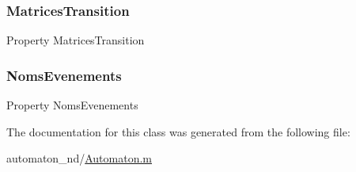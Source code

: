 \mbox{\label{class_automaton_ac685ee2b0b12e73b394a56bbd94b2d0c}} 
\subsubsection{\texorpdfstring{Matrices\+Transition}{MatricesTransition}}
{\footnotesize\ttfamily Property Matrices\+Transition}

\mbox{\label{class_automaton_abe3803f90671c5ccbde973c2d8ca5d7c}} 
\subsubsection{\texorpdfstring{Noms\+Evenements}{NomsEvenements}}
{\footnotesize\ttfamily Property Noms\+Evenements}



The documentation for this class was generated from the following file\+:\begin{DoxyCompactItemize}
\item 
automaton\+\_\+nd/\hyperlink{_automaton_8m}{Automaton.\+m}\end{DoxyCompactItemize}
